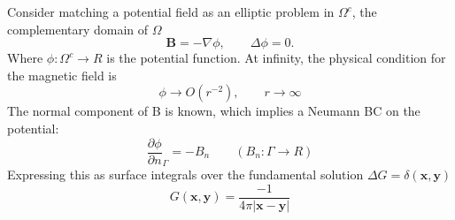 \documentclass[11pt]{article}
\begin{document}
Consider matching a potential field as an elliptic problem in $\Omega^c$, the complementary domain of $\Omega$
\begin{equation}
  \mathbf{B} = -\nabla \phi, \qquad \Delta \phi = 0.
\end{equation}
Where $\phi: \Omega^c \rightarrow R$ is the potential function. At infinity, the physical condition for the magnetic field is
\begin{equation}
  \phi \rightarrow O(r^{-2}), \qquad r \rightarrow \infty
\end{equation}
The normal component of B is known, which implies a Neumann BC on the potential:
\begin{equation}
  \frac{\partial \phi}{\partial n}_{\Gamma} = - B_n \qquad (B_n: \Gamma \rightarrow R)
\end{equation}
Expressing this as surface integrals over the fundamental solution $\Delta G = \delta(\mathbf{x},\mathbf{y})$
\begin{equation}
  G(\mathbf{x},\mathbf{y}) = \frac{-1}{4 \pi |\mathbf{x}-\mathbf{y}|}
\end{equation}
\end{document}
